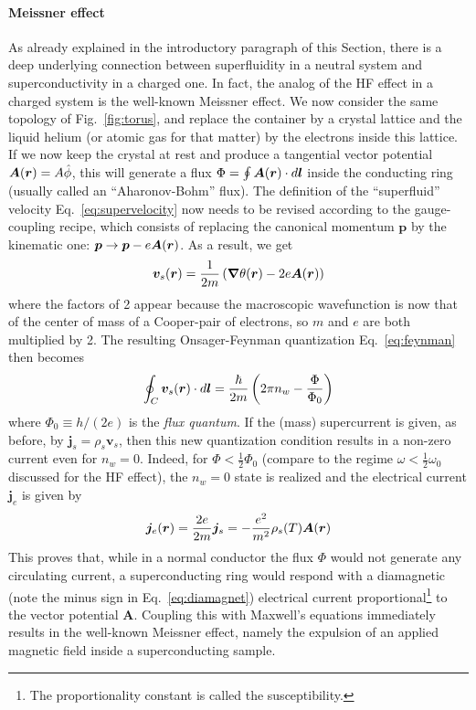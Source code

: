 \paragraph{Meissner effect}
As already explained in the introductory paragraph of this Section,
there is a deep underlying connection between superfluidity in a
neutral system and superconductivity in a charged one. In fact, the
analog of the HF effect in a charged system is the well-known Meissner
effect.
%
We now consider the same topology of Fig.~\ref{fig:torus}, and replace
the container by a crystal lattice and the liquid helium (or atomic
gas for that matter) by the electrons inside this lattice. If we now
keep the crystal at rest and produce a tangential vector potential
$\bm{A}(\bm{r}) = A\hat{\phi}$, this will generate a flux
$\Phi = \oint \bm{A}(\bm{r})\cdot d\bm{l}$ inside the conducting ring (usually
called an ``Aharonov-Bohm'' flux). The definition of the
``superfluid'' velocity Eq.~\eqref{eq:supervelocity} now needs to be
revised according to the gauge-coupling recipe, which consists of
replacing the canonical momentum $\bm{p}$ by the kinematic one:
$\bm{p} \rightarrow \bm{p} - e\bm{A}(\bm{r})$. As a result, we get
%
\begin{equation}\label{eq:superconducting-velocity}
  \bm{v}_s(\bm{r}) = \frac{1}{2m}\left(\bm{\nabla}\theta(\bm{r}) -
    2e\bm{A}(\bm{r})\right)
\end{equation}
% 
where the factors of 2 appear because the macroscopic wavefunction is
now that of the center of mass of a Cooper-pair of electrons, so $m$
and $e$ are both multiplied by 2. The resulting Onsager-Feynman
quantization Eq.~\eqref{eq:feynman} then becomes
%
\begin{equation}\label{eq:superconducting-feynman}
  \oint_C \bm{v}_s(\bm{r}) \cdot d\bm{l} = \frac{\hbar}{2m} \left(2\pi n_w -
    \frac{\Phi}{\Phi_0}\right)
\end{equation}
% 
where $\Phi_0 \equiv h/(2e)$ is the \textit{flux quantum}. If the
(mass) supercurrent is given, as before, by
$\bm{j}_s = \rho_s \bm{v}_s$, then this new quantization condition
results in a non-zero current even for $n_w = 0$. Indeed, for
$\Phi < \frac{1}{2} \Phi_0$ (compare to the regime
$\omega < \frac{1}{2}\omega_0$ discussed for the HF effect), the
$n_w = 0$ state is realized and the electrical current $\bm{j}_e$ is
given by
%
\begin{equation}\label{eq:diamagnet}
  \bm{j}_e(\bm{r}) = \frac{2e}{2m}\bm{j}_s = - \frac{e^2}{m^2}\rho_s(T) \bm{A}(\bm{r})
\end{equation}
%
This proves that, while in a normal conductor the flux $\Phi$ would
not generate any circulating current, a superconducting ring would
respond with a diamagnetic (note the minus sign in
Eq.~\eqref{eq:diamagnet}) electrical current proportional\footnote{The
  proportionality constant is called the susceptibility.} to the
vector potential $\bm{A}$. Coupling this with Maxwell's equations
immediately results in the well-known Meissner effect, namely the
expulsion of an applied magnetic field inside a superconducting
sample.


